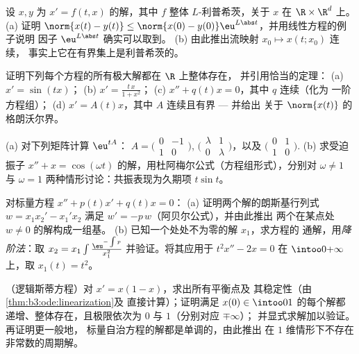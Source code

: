 \begin{exercise}[$\star$]\label{exo:b3:ode:2}
设 $x, y$ 为 $x' = f(t,x)$ 的解，其中 $f$
整体 $L$-利普希茨，关于 $x$ 在 $\R\times\R^d$ 上。
(a) 证明 $\norm{x(t) - y(t)} \leq \norm{x(0) -
y(0)}\eu^{L\abs t}$，并用线性方程的例子说明
因子 $\eu^{L\abs t}$ 确实可以取到。
(b) 由此推出流映射 $x_0 \mapsto x(t; x_0)$ 连续，
事实上它在有界集上是利普希茨的。
\end{exercise}

\begin{exercise}[$\star\star$]\label{exo:b3:ode:3}
证明下列每个方程的所有极大解都在 $\R$ 上整体存在，
并引用恰当的定理：
(a) $x' = \sin(tx)$；
(b) $x' = \frac{t\,x}{1 + x^2}$；
(c) $x'' + q(t)x = 0$，其中 $q$ 连续（化为
一阶方程组）；
(d) $x' = A(t)x$，其中 $A$ 连续且有界 --- 并给出
关于 $\norm{x(t)}$ 的格朗沃尔界。
\end{exercise}

\begin{exercise}[$\star\star$]\label{exo:b3:ode:4}
(a) 对下列矩阵计算 $\eu^{tA}$：
$A = \bigl(\begin{smallmatrix}0 & -1\\ 1 &
0\end{smallmatrix}\bigr)$,
$\bigl(\begin{smallmatrix}\lambda & 1\\ 0 &
\lambda\end{smallmatrix}\bigr)$，以及
$\bigl(\begin{smallmatrix}0 & 1\\ 1 &
0\end{smallmatrix}\bigr)$.
(b) 求受迫振子 $x'' + x = \cos(\omega t)$
的解，用杜阿梅尔公式（方程组形式），分别对 $\omega \neq 1$ 与 $\omega =
1$ 两种情形讨论：共振表现为久期项 $t\sin t$。
\end{exercise}

\begin{exercise}[$\star\star$]\label{exo:b3:ode:5}
对标量方程 $x'' + p(t)x' + q(t)x = 0$：
(a) 证明两个解的朗斯基行列式 $w = x_1x_2' - x_1'x_2$
满足 $w' = -p\,w$（阿贝尔公式），并由此推出
两个在某点处 $w \neq 0$ 的解构成一组基。
(b) 已知一个处处不为零的解 $x_1$，求方程的
通解，用\emph{降阶法}：取 $x_2 = x_1\int
\frac{\eu^{-\int p}}{x_1^2}$ 并验证。将其应用于 $t^2x'' -
2x = 0$ 在 $\intoo0{+\infty}$ 上，取 $x_1(t) = t^2$。
\end{exercise}

\begin{exercise}[$\star\star$]\label{exo:b3:ode:6}
（逻辑斯蒂方程）对 $x' = x(1 - x)$，求出所有平衡点及
其稳定性（由\cref{thm:b3:ode:linearization}及
直接计算）；证明满足 $x(0) \in \intoo01$ 的每个解都
递增、整体存在，且极限依次为 $0$ 与 $1$（分别对应 $\mp\infty$）；
并显式求解加以验证。再证明更一般地，
标量自治方程的解都是单调的，由此推出
在 $1$ 维情形下不存在非常数的周期解。
\end{exercise}

